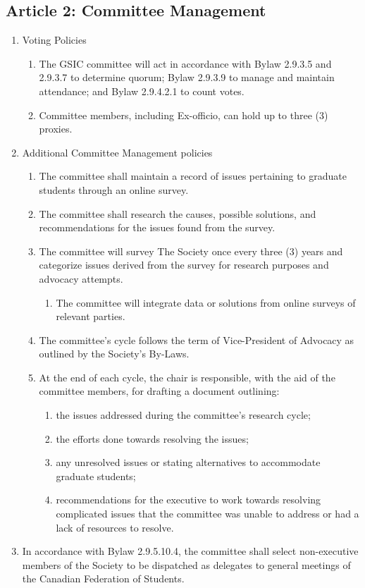 \subsection{Article 2: Committee Management}
\begin{enumerate}[label*=\arabic*., align=left]	
\item Voting Policies
\begin{enumerate}[label*=\arabic*., align=left]	
\item The GSIC committee will act in accordance with Bylaw 2.9.3.5 and 2.9.3.7 to determine quorum; Bylaw 2.9.3.9 to manage and maintain attendance; and Bylaw 2.9.4.2.1 to count votes.
\item Committee members, including Ex-officio, can hold up to three (3) proxies.
\end{enumerate}

\item Additional Committee Management policies
\begin{enumerate}[label*=\arabic*., align=left]	
\item The committee shall maintain a record of issues pertaining to graduate students through an online survey.
\item The committee shall research the causes, possible solutions, and recommendations for the issues found from the survey.
\item The committee will survey The Society once every three (3) years and categorize issues derived from the survey for research purposes and advocacy attempts.
	\begin{enumerate}[label*=\arabic*., align=left]	
	\item The committee will integrate data or solutions from online surveys of relevant parties.
	\end{enumerate}
\item The committee’s cycle follows the term of Vice-President of Advocacy as outlined by the Society’s By-Laws.
\item At the end of each cycle, the chair is responsible, with the aid of the committee members, for drafting a document outlining:
	\begin{enumerate}[label*=\arabic*., align=left]	
	\item the issues addressed during the committee’s research cycle;
	\item the efforts done towards resolving the issues;
	\item any unresolved issues or stating alternatives to accommodate graduate students;
	\item recommendations for the executive to work towards resolving complicated issues that the committee was unable to address or had a lack of resources to resolve.
	\end{enumerate}
\end{enumerate}
\item In accordance with Bylaw 2.9.5.10.4, the committee shall select non-executive members of the Society to be dispatched as delegates to general meetings of the Canadian Federation of Students.
\end{enumerate}